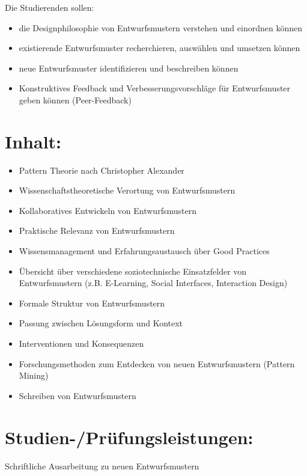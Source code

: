 Die Studierenden sollen:

\begin{itemize}
\tightlist
\item
  die Designphilosophie von Entwurfsmustern verstehen und einordnen
  können
\item
  existierende Entwurfsmuster recherchieren, auswählen und umsetzen
  können
\item
  neue Entwurfsmuster identifizieren und beschreiben können
\item
  Konstruktives Feedback und Verbesserungsvorschläge für Entwurfsmuster
  geben können (Peer-Feedback)
\end{itemize}

\section*{Inhalt:}\label{inhalt-12}

\begin{itemize}
\tightlist
\item
  Pattern Theorie nach Christopher Alexander
\item
  Wissenschaftstheoretische Verortung von Entwurfsmustern
\item
  Kollaboratives Entwickeln von Entwurfsmustern
\item
  Praktische Relevanz von Entwurfsmustern
\item
  Wissensmanagement und Erfahrungsaustausch über Good Practices
\item
  Übersicht über verschiedene soziotechnische Einsatzfelder von
  Entwurfsmustern (z.B. E-Learning, Social Interfaces, Interaction
  Design)
\item
  Formale Struktur von Entwurfsmustern
\item
  Passung zwischen Lösungsform und Kontext
\item
  Interventionen und Konsequenzen
\item
  Forschungsmethoden zum Entdecken von neuen Entwurfsmustern (Pattern
  Mining)
\item
  Schreiben von Entwurfsmustern
\end{itemize}

\section*{Studien-/Prüfungsleistungen:}\label{studien-pruxfcfungsleistungen-12}

Schriftliche Ausarbeitung zu neuen Entwurfsmustern

